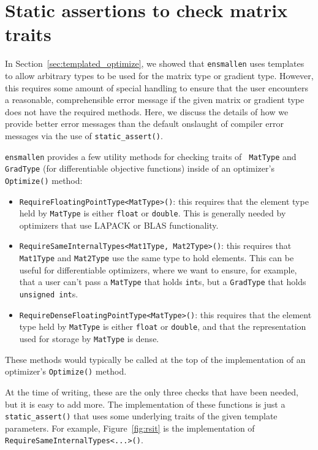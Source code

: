 \section{Static assertions to check matrix traits}
\label{sec:templated_optimize_details}

In Section~\ref{sec:templated_optimize}, we showed that {\tt ensmallen} uses
templates to allow arbitrary types to be used for the matrix type or gradient
type.  However, this requires some amount of special handling to ensure that the
user encounters a reasonable, comprehensible error message if the given matrix
or gradient type does not have the required methods.  Here, we discuss the
details of how we provide better error messages than the default onslaught of
compiler error messages via the use of {\tt static\_assert()}.

{\tt ensmallen} provides a few utility methods for checking traits of {\tt
MatType} and {\tt GradType} (for differentiable objective functions) inside of
an optimizer's {\tt Optimize()} method:

\begin{itemize}
  \item {\tt RequireFloatingPointType<MatType>()}: this requires that the
element type held by {\tt MatType} is either {\tt float} or {\tt double}.
This is generally needed by optimizers that use LAPACK or BLAS functionality.

  \item {\tt RequireSameInternalTypes<Mat1Type, Mat2Type>()}: this requires that
{\tt Mat1Type} and {\tt Mat2Type} use the same type to hold elements.  This can
be useful for differentiable optimizers, where we want to ensure, for example,
that a user can't pass a {\tt MatType} that holds {\tt int}s, but a {\tt GradType} that
holds {\tt unsigned int}s.

  \item {\tt RequireDenseFloatingPointType<MatType>()}: this requires that the
element type held by {\tt MatType} is either {\tt float} or {\tt double}, and
that the representation used for storage by {\tt MatType} is dense.
\end{itemize}

These methods would typically be called at the top of the implementation of an
optimizer's {\tt Optimize()} method.

At the time of writing, these are the only three checks that have
been needed, but it is easy to add more.  The implementation of these functions
is just a {\tt static\_assert()} that uses some underlying traits of the given
template parameters.  For example, Figure~\ref{fig:rsit} is the implementation
of {\tt RequireSameInternalTypes<...>()}.

